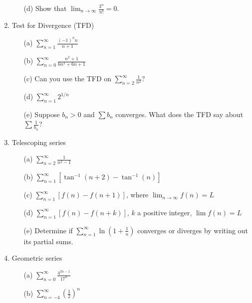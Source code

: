 \documentclass[12pt]{article}
\begin{document}
\begin{enumerate}
\begin{enumerate}
\item[(d)] Show that $\lim_{n\to\infty}\frac{3^n}{n!}=0$.

\end{enumerate}

\setcounter{enumi}{15}
\item Test for Divergence (TFD)
\begin{enumerate}
\item[(a)] $\sum_{n=1}^\infty\frac{(-1)^nn}{n+1}$

\item[(b)] $\sum_{n=0}^\infty\frac{n^2+1}{6n^2+6n+1}$

\item[(c)] Can you use the TFD on $\sum_{n=2}^\infty\frac{1}{n^2}$?

\item[(d)] $\sum_{n=1}^\infty2^{1/n}$

\item[(e)] Suppose $b_n>0$ and $\sum b_n$ converges. What does the TFD say about $\sum\frac{1}{b_n}$?

\end{enumerate}

\setcounter{enumi}{16}
\item Telescoping series
\begin{enumerate}
\item[(a)] $\sum_{n=2}^\infty\frac{1}{n^2-1}$

\item[(b)] $\sum_{n=1}^\infty\left[\tan^{-1}(n+2)-\tan^{-1}(n)\right]$

\item[(c)] $\sum_{n=1}^\infty\left[f(n)-f(n+1)\right]$, where $\lim_{n\to\infty}f(n)=L$

\item[(d)] $\sum_{n=1}^\infty\left[f(n)-f(n+k)\right]$, $k$ a positive integer, $\lim f(n)=L$

\item[(e)] Determine if $\sum_{n=1}^\infty\ln\left(1+\frac1n\right)$ converges or diverges by writing out its partial sums.

\end{enumerate}

\setcounter{enumi}{17}
\item Geometric series
\begin{enumerate}
\item[(a)] $\sum_{n=0}^\infty\frac{4^{2n-1}}{17^n}$

\item[(b)] $\sum_{n=-4}^\infty\left(\frac12\right)^n$


\end{enumerate}
\end{enumerate}
\end{document}
